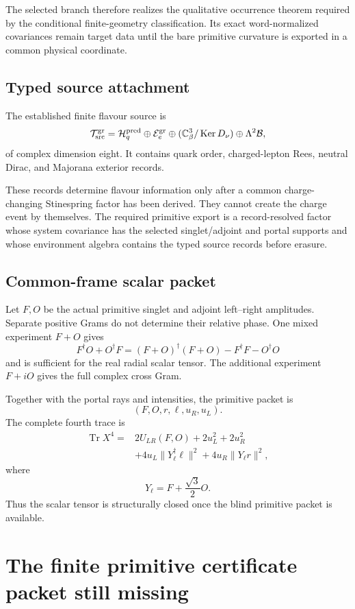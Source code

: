 \documentclass[11pt,oneside,openany]{book}
\numberwithin{equation}{chapter}
\theoremstyle{definition}
\theoremstyle{remark}
\newcommand{\C}{\mathbb C}
\newcommand{\Tr}{\operatorname{Tr}}
\newcommand{\Ker}{\operatorname{Ker}}
\newcommand{\norm}[1]{\lVert #1\rVert}
\begin{document}
The selected branch therefore realizes the qualitative occurrence theorem
required by the conditional finite-geometry classification.  Its exact
word-normalized covariances remain target data until the bare primitive
curvature is exported in a common physical coordinate.

\section{Typed source attachment}

The established finite flavour source is
\[
 \mathcal T_{\rm src}^{\rm gr}
 =
 \mathcal H_q^{\rm pred}
 \oplus
 \mathcal E_e^{\rm gr}
 \oplus
 (\C^3_\beta/\Ker D_\nu)
 \oplus
 \Lambda^2\mathcal B,
\]
of complex dimension eight.  It contains quark order, charged-lepton Rees,
neutral Dirac, and Majorana exterior records.

These records determine flavour information only after a common
charge-changing Stinespring factor has been derived.  They cannot create the
charge event by themselves.  The required primitive export is a
record-resolved factor whose system covariance has the selected
singlet/adjoint and portal supports and whose environment algebra contains
the typed source records before erasure.

\section{Common-frame scalar packet}

Let \(F,O\) be the actual primitive singlet and adjoint left--right amplitudes.
Separate positive Grams do not determine their relative phase.  One mixed
experiment \(F+O\) gives
\[
 F^\dagger O+O^\dagger F
 =
 (F+O)^\dagger(F+O)-F^\dagger F-O^\dagger O
\]
and is sufficient for the real radial scalar tensor.  The additional
experiment \(F+iO\) gives the full complex cross Gram.

Together with the portal rays and intensities, the primitive packet is
\[
 \boxed{
 (F,O,r,\ell,u_R,u_L).}
\]
The complete fourth trace is
\[
 \boxed{
 \begin{aligned}
 \Tr X^4
 ={}&
 2U_{LR}(F,O)
 +
 2u_L^2+2u_R^2\\
 &+
 4u_L\norm{Y_\ell^\dagger\ell}^2
 +
 4u_R\norm{Y_\ell r}^2,
 \end{aligned}}
\]
where
\[
 Y_\ell=F+\frac{\sqrt3}{2}O.
\]
Thus the scalar tensor is structurally closed once the blind primitive packet
is available.

\chapter{The finite primitive certificate packet still missing}
\label{ch:missing-theorem}
\end{document}
